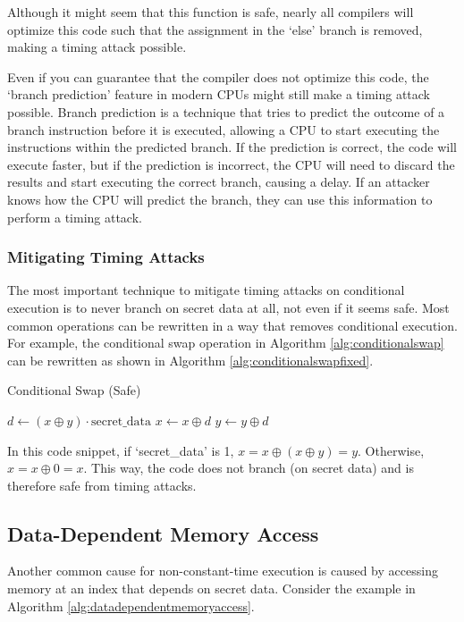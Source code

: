 \documentclass[11pt,a4paper]{report}
\theoremstyle{definition}
\begin{document}
Although it might seem that this function is safe, nearly all compilers will optimize this code such that the assignment in the `else' branch is removed, making a timing attack possible.

Even if you can guarantee that the compiler does not optimize this code, the `branch prediction' feature in modern CPUs might still make a timing attack possible. Branch prediction is a technique that tries to predict the outcome of a branch instruction before it is executed, allowing a CPU to start executing the instructions within the predicted branch. If the prediction is correct, the code will execute faster, but if the prediction is incorrect, the CPU will need to discard the results and start executing the correct branch, causing a delay. If an attacker knows how the CPU will predict the branch, they can use this information to perform a timing attack.

\subsubsection{Mitigating Timing Attacks}
The most important technique to mitigate timing attacks on conditional execution is to never branch on secret data at all, not even if it seems safe. Most common operations can be rewritten in a way that removes conditional execution. For example, the conditional swap operation in Algorithm \ref{alg:conditionalswap} can be rewritten as shown in Algorithm \ref{alg:conditionalswapfixed}.

\begin{algorithm}
  \caption{Conditional Swap (Safe)}
  \label{alg:conditionalswapfixed}
  \begin{algorithmic}[1]
      \State $d \gets (x \oplus y) \cdot \text{secret\_data}$ 
      \State $x \gets x \oplus d$
      \State $y \gets y \oplus d$
    \EndFunction
  \end{algorithmic}
\end{algorithm}

In this code snippet, if `secret\_data' is 1, $x = x \oplus (x \oplus y) = y$. Otherwise, $x = x \oplus 0 = x$. This way, the code does not branch (on secret data) and is therefore safe from timing attacks.

\subsection{Data-Dependent Memory Access}
\label{sec:datadependentmemoryaccess}
Another common cause for non-constant-time execution is caused by accessing memory at an index that depends on secret data. Consider the example in Algorithm \ref{alg:datadependentmemoryaccess}.
\end{document}
